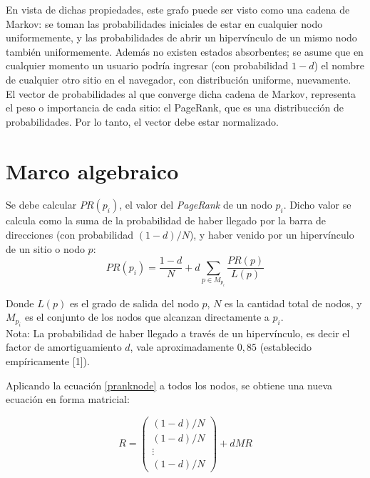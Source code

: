\documentclass[%
    final,
    notitlepage,
    narroweqnarray,
    inline,
    twoside,
    invited
    ]{lib/ieee}
\begin{document}
En vista de dichas propiedades, este grafo puede ser visto como una cadena de Markov: se toman las probabilidades iniciales de
estar en cualquier nodo uniformemente, y las probabilidades de abrir un hipervínculo de un mismo nodo también uniformemente. Además no existen
estados absorbentes; se asume que en cualquier momento un usuario podría ingresar (con probabilidad $1-d$) el nombre de cualquier otro sitio en el navegador, con distribución
uniforme, nuevamente.\\

El vector de probabilidades al que converge dicha cadena de Markov, representa el peso o importancia de cada sitio: el PageRank, que es una distribucción de probabilidades.
Por lo tanto, el vector debe estar normalizado.

\section{Marco algebraico}

\par Se debe calcular $PR(p_i)$, el valor del \textit{PageRank} de un nodo $p_i$. Dicho valor se calcula como la suma de la probabilidad de haber
llegado por la barra de direcciones (con probabilidad $(1-d)/N$), y haber venido por un hipervínculo de un sitio o nodo $p$: \\

\begin{equation}\label{pranknode}
    PR(p_i) = \frac{1-d}{N} + d \sum_{p \in M_{p_{i}}} \frac{PR(p)}{L(p)}
\end{equation}

Donde $L(p)$ es el grado de salida del nodo $p$, $N$ es la cantidad total de nodos, y $M_{p_i}$ es el conjunto de los nodos que alcanzan directamente a $p_i$.\\

Nota: La probabilidad de haber llegado a través de un hipervínculo, es decir el factor de amortiguamiento $d$, vale aproximadamente $0,85$ (establecido empíricamente [1]).

Aplicando la ecuación \eqref{pranknode} a todos los nodos, se obtiene una nueva ecuación en forma matricial:

\begin{equation}\label{pranksolution}
    R = \begin{pmatrix}
            (1-d)/N \\ (1-d)/N \\ \vdots \\ (1-d)/N
        \end{pmatrix}
        + dMR
\end{equation}
\end{document}
